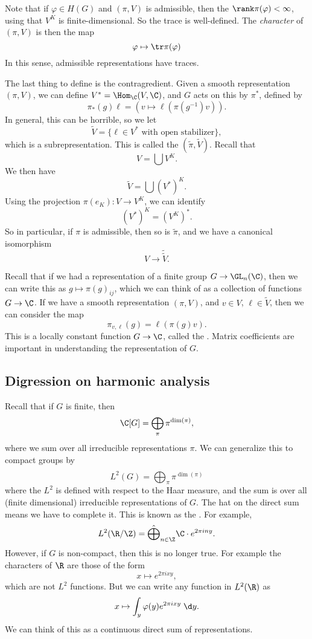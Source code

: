 \documentclass[a4paper]{article}
\begin{document}
Note that if $\varphi \in H(G)$ and $(\pi, V)$ is admissible, then the $\rank \pi(\varphi) < \infty$, using that $V^K$ is finite-dimensional. So the trace is well-defined. The \emph{character} of $(\pi, V)$ is then the map
\[
  \varphi \mapsto \tr \pi(\varphi)
\]
In this sense, admissible representations have traces.

The last thing to define is the contragredient. Given a smooth representation $(\pi, V)$, we can define $V^* = \Hom_\C(V, \C)$, and $G$ acts on this by $\pi^*$, defined by
\[
  \pi_*(g)\ell = (v \mapsto \ell(\pi(g^{-1})v)).
\]
In general, this can be horrible, so we let
\[
  \tilde{V} = \{\ell \in V^* \text{ with open stabilizer}\},
\]
which is a subrepresentation. This is called the  $(\tilde{\pi}, \tilde{V})$. Recall that
\[
  V = \bigcup V^K.
\]
We then have
\[
  \tilde{V} = \bigcup (V^*)^K.
\]
Using the projection $\pi(e_K): V \to V^K$, we can identify
\[
  (V^*)^K = (V^K)^*.
\]
So in particular, if $\pi$ is admissible, then so is $\tilde{\pi}$, and we have a canonical isomorphism
\[
  V \to \tilde{\tilde{V}}.
\]

Recall that if we had a representation of a finite group $G \to \GL_n(\C)$, then we can write this as $g \mapsto \pi(g)_{ij}$, which we can think of as a collection of functions $G \to \C$. If we have a smooth representation $(\pi, V)$, and $v \in V$, $\ell \in \tilde{V}$, then we can consider the map
\[
  \pi_{v, \ell}(g) = \ell(\pi(g) v).
\]
This is a locally constant function $G \to \C$, called the . Matrix coefficients are important in understanding the representation of $G$.

\subsection{Digression on harmonic analysis}
Recall that if $G$ is finite, then
\[
  \C[G] = \bigoplus_{\pi} \pi^{\dim (\pi)},
\]
where we sum over all irreducible representations $\pi$. We can generalize this to compact groups by
\[
  L^2(G) = \hat{\bigoplus_{\pi}} \pi^{\dim (\pi)}
\]
where the $L^2$ is defined with respect to the Haar measure, and the sum is over all (finite dimensional) irreducible representations of $G$. The hat on the direct sum means we have to complete it. This is known as the . For example,
\[
  L^2(\R/\Z) = \hat{\bigoplus}_{n \in \Z} \C \cdot e^{2\pi i n y}.
\]
However, if $G$ is non-compact, then this is no longer true. For example the characters of $\R$ are those of the form
\[
  x \mapsto e^{2\pi i xy},
\]
which are not $L^2$ functions. But we can write any function in $L^2(\R)$ as
\[
  x \mapsto \int_y \varphi(y) e^{2\pi i xy} \;\d y.
\]
We can think of this as a continuous direct sum of representations.
\end{document}
